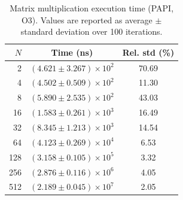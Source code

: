\begin{table}[ht]
    \centering
    \caption{Matrix multiplication execution time (PAPI, O3). Values are reported as average $\pm$ standard deviation over 100 iterations.}
    \label{tab:mm-papi-o3}
    \begin{tabular}{rcc}
        \hline
        $N$ & Time (ns) & Rel. std (\%) \\
        \hline
        2 & $(4.621 \pm 3.267) \times 10^{2}$ & 70.69 \\
        4 & $(4.502 \pm 0.509) \times 10^{2}$ & 11.30 \\
        8 & $(5.890 \pm 2.535) \times 10^{2}$ & 43.03 \\
        16 & $(1.583 \pm 0.261) \times 10^{3}$ & 16.49 \\
        32 & $(8.345 \pm 1.213) \times 10^{3}$ & 14.54 \\
        64 & $(4.123 \pm 0.269) \times 10^{4}$ & 6.53 \\
        128 & $(3.158 \pm 0.105) \times 10^{5}$ & 3.32 \\
        256 & $(2.876 \pm 0.116) \times 10^{6}$ & 4.05 \\
        512 & $(2.189 \pm 0.045) \times 10^{7}$ & 2.05 \\
        \hline
    \end{tabular}
\end{table}
